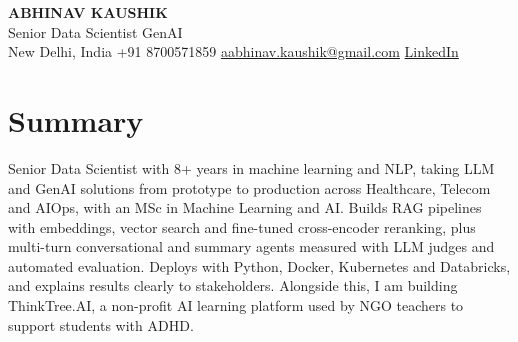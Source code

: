 \documentclass[10pt,a4paper]{article}
\begin{document}
\begin{center}
  {\LARGE\bfseries ABHINAV KAUSHIK}\\[2pt]
  {\large Senior Data Scientist GenAI}\\[2pt]
  New Delhi, India \textbar{} +91 8700571859 \textbar{} \href{mailto:aabhinav.kaushik@gmail.com}{aabhinav.kaushik@gmail.com} \textbar{} \href{https://www.linkedin.com/in/abhinav-kaushik10/}{LinkedIn}  
\end{center}

\section{Summary}
Senior Data Scientist with 8+ years in machine learning and NLP, taking LLM and GenAI solutions from prototype to production across Healthcare, Telecom and AIOps, with an MSc in Machine Learning and AI. Builds RAG pipelines with embeddings, vector search and fine-tuned cross-encoder reranking, plus multi-turn conversational and summary agents measured with LLM judges and automated evaluation. Deploys with Python, Docker, Kubernetes and Databricks, and explains results clearly to stakeholders. Alongside this, I am building ThinkTree.AI, a non-profit AI learning platform used by NGO teachers to support students with ADHD.
\end{document}
